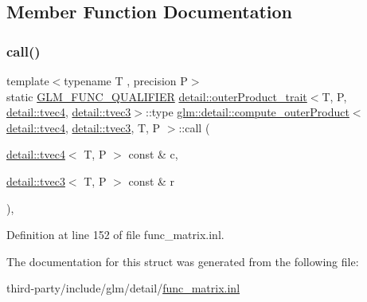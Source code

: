 \subsection{Member Function Documentation}
\mbox{\label{structglm_1_1detail_1_1compute__outer_product_3_01detail_1_1tvec4_00_01detail_1_1tvec3_00_01_t_00_01_p_01_4_a7e5367e91d2b8d7863f6e5b277317c45}} 
\subsubsection{\texorpdfstring{call()}{call()}}
{\footnotesize\ttfamily template$<$typename T , precision P$>$ \\
static \hyperlink{setup_8hpp_a33fdea6f91c5f834105f7415e2a64407}{G\+L\+M\+\_\+\+F\+U\+N\+C\+\_\+\+Q\+U\+A\+L\+I\+F\+I\+ER} \hyperlink{structglm_1_1detail_1_1outer_product__trait}{detail\+::outer\+Product\+\_\+trait}$<$T, P, \hyperlink{structglm_1_1detail_1_1tvec4}{detail\+::tvec4}, \hyperlink{structglm_1_1detail_1_1tvec3}{detail\+::tvec3}$>$\+::type \hyperlink{structglm_1_1detail_1_1compute__outer_product}{glm\+::detail\+::compute\+\_\+outer\+Product}$<$ \hyperlink{structglm_1_1detail_1_1tvec4}{detail\+::tvec4}, \hyperlink{structglm_1_1detail_1_1tvec3}{detail\+::tvec3}, T, P $>$\+::call (\begin{DoxyParamCaption}\item[{\hyperlink{structglm_1_1detail_1_1tvec4}{detail\+::tvec4}$<$ T, P $>$ const \&}]{c,  }\item[{\hyperlink{structglm_1_1detail_1_1tvec3}{detail\+::tvec3}$<$ T, P $>$ const \&}]{r }\end{DoxyParamCaption})\hspace{0.3cm}{\ttfamily [inline]}, {\ttfamily [static]}}



Definition at line 152 of file func\+\_\+matrix.\+inl.



The documentation for this struct was generated from the following file\+:\begin{DoxyCompactItemize}
\item 
third-\/party/include/glm/detail/\hyperlink{func__matrix_8inl}{func\+\_\+matrix.\+inl}\end{DoxyCompactItemize}
